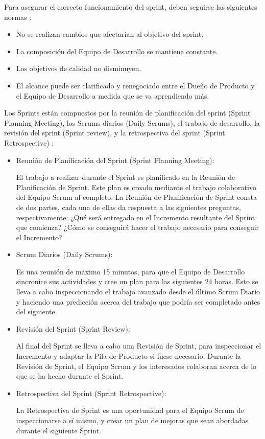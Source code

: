 Para asegurar el correcto funcionamiento del sprint, deben seguirse las siguientes normas \cite{MMSCRM}:
\begin{itemize}[noitemsep,nolistsep]
\item No se realizan cambios que afectarían al objetivo del sprint.
\item La composición del Equipo de Desarrollo se mantiene constante.
\item	Los objetivos de calidad no disminuyen.
\item	El alcance puede ser clarificado y renegociado entre el Dueño de Producto y el Equipo de Desarrollo a medida que se va aprendiendo más.
\end{itemize}

Los Sprints están compuestos por la reunión de planificación del sprint (Sprint Planning Meeting), los Scrums diarios (Daily Scrums), el trabajo de desarrollo, la revisión del sprint (Sprint review), y la retrospectiva del sprint (Sprint Retrospective) \cite{MMSCRM}:

\begin{itemize}[noitemsep,nolistsep]
\item {Reunión de Planificación del Sprint (Sprint Planning Meeting):}

El trabajo a realizar durante el Sprint es planificado en la Reunión de Planificación de Sprint. Este plan es creado mediante el trabajo colaborativo del Equipo Scrum al completo.
La Reunión de Planificación de Sprint consta de dos partes, cada una de ellas da respuesta a las siguientes preguntas, respectivamente: ¿Qué será entregado en el Incremento resultante del Sprint que comienza? ¿Cómo se conseguirá hacer el trabajo necesario para conseguir el Incremento?
\item {Scrum Diarios (Daily Scrums):}

Es una reunión de máximo 15 minutos, para que el Equipo de Desarrollo sincronice sus actividades y cree un plan para las siguientes 24 horas. Esto se lleva a cabo inspeccionando el trabajo avanzado desde el último Scrum Diario y haciendo una predicción acerca del trabajo que podría ser completado antes del siguiente. 
\item {Revisión del Sprint (Sprint Review):}

Al final del Sprint se lleva a cabo una Revisión de Sprint, para inspeccionar el Incremento y adaptar la Pila de Producto si fuese necesario. Durante la Revisión de Sprint, el Equipo Scrum y los interesados colaboran acerca de lo que se ha hecho durante el Sprint.
\item {Retrospectiva del Sprint (Sprint Retrospective):}

La Retrospectiva de Sprint es una oportunidad para el Equipo Scrum de inspeccionarse a sí mismo, y crear un plan de mejoras que sean abordadas durante el siguiente Sprint.
\end{itemize}

